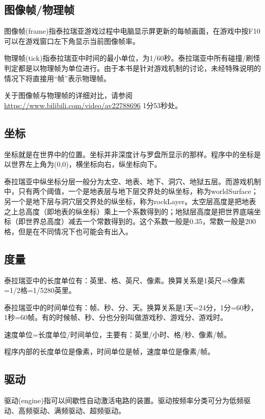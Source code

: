 \subsection{图像帧/物理帧}

图像帧(frame)指泰拉瑞亚游戏过程中电脑显示屏更新的每帧画面，在游戏中按F10可以在游戏窗口左下角显示当前图像帧率。

物理帧(tick)指泰拉瑞亚中时间的最小单位，为1/60秒。泰拉瑞亚中所有碰撞/刷怪判定都是以物理帧为单位进行。由于本书是针对游戏机制的讨论，未经特殊说明的情况下将直接用“帧”表示物理帧。

关于图像帧与物理帧的详细对比，请参阅\url{https://www.bilibili.com/video/av22788696} 1分53秒处。

\subsection{坐标}
坐标就是在世界中的位置。坐标并非深度计与罗盘所显示的那样。程序中的坐标是以世界左上角为(0,0)，横坐标向右，纵坐标向下。

泰拉瑞亚中纵坐标分层一般分为太空、地表、地下、洞穴、地狱五层。而游戏机制中，只有两个阈值，一个是地表层与地下层交界处的纵坐标，称为worldSurface；另一个是地下层与洞穴层交界处的纵坐标，称为rockLayer。太空层高度是把地表之上总高度（即地表的纵坐标）乘上一个系数得到的；地狱层高度是把世界底端坐标（即世界总高度）减去一个常数得到的。这个系数一般是0.35，常数一般是200格，但是在不同情况下也可能会有出入。

\subsection{度量}
泰拉瑞亚中的长度单位有：英里、格、英尺、像素。换算关系是1英尺=8像素=1/2格=1/5280英里。

泰拉瑞亚中的时间单位有：帧、秒、分、天。换算关系是1天=24分，1分=60秒，1秒=60帧。有的时候帧、秒、分也分别叫做游戏秒、游戏分、游戏时。

速度单位=长度单位/时间单位，主要有：英里/小时、格/秒、像素/帧。

程序内部的长度单位是像素，时间单位是帧，速度单位是像素/帧。

\subsection{驱动}

驱动(engine)指可以间歇性自动激活电路的装置。驱动按频率分类可分为低频驱动、高频驱动、满频驱动、超频驱动。

